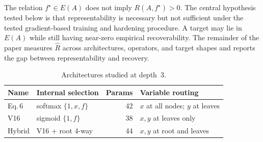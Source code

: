 The relation $f^\star \in E(A)$ does not imply $R(A, f^\star) > 0$.
The central hypothesis tested below is that representability is
necessary but not sufficient under the tested gradient-based
training and hardening procedure.  A target may lie in $E(A)$
while still having near-zero empirical recoverability.
The remainder of the paper measures $\hat R$ across architectures,
operators, and target shapes and reports the gap between
representability and recovery.

\begin{table}[t]
\centering
\caption{Architectures studied at depth~3.}
\label{tab:archs}
\footnotesize
\begin{tabular}{@{}llrl@{}}
\toprule
Name & Internal selection & Params & Variable routing \\
\midrule
Eq.\,6 & softmax $\{1,x,f\}$ & 42 & $x$ at all nodes; $y$ at leaves \\
V16    & sigmoid $\{1,f\}$   & 38 & $x,y$ at leaves only \\
Hybrid & V16 + root 4-way    & 44 & $x,y$ at root and leaves \\
\bottomrule
\end{tabular}
\end{table}
